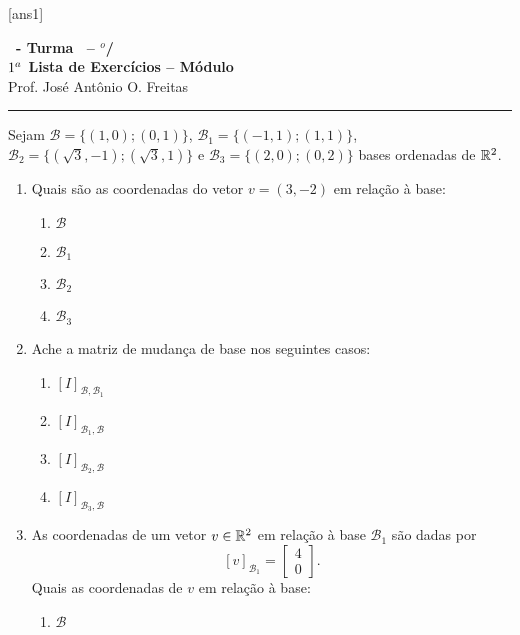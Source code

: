 \documentclass[12pt]{exam}
\begin{document}
  [ans1]
  \begin{center}
    {\Large\bf \disciplina\ - Turma \turma\ -- \semestre$^{o}$/\ano} \\ \vspace{9pt} {\large\bf
        $1^a$ Lista de Exercícios -- Módulo \numeromodulo}\\ \vspace{9pt} Prof. José Antônio O. Freitas
  \end{center}
  \hrule


\begin{exercicio}
    Sejam $\mathcal{B} = \{(1,0);(0,1)\}$, $\mathcal{B}_1 = \{(-1,1);(1,1)\}$, $\mathcal{B}_2 = \{(\sqrt{3},-1);(\sqrt{3},1)\}$ e $\mathcal{B}_3 = \{(2,0);(0,2)\}$ bases ordenadas de $\mathbb{R}^2$.
    \begin{enumerate}[label={\alph*})]
        \item Quais são as coordenadas do vetor $v = (3,-2)$ em relação à base:
        \begin{enumerate}[label=({\roman*})]
            \item $\mathcal{B}$

            \item $\mathcal{B}_1$

            \item $\mathcal{B}_2$

            \item $\mathcal{B}_3$
        \end{enumerate}

        \item Ache a matriz de mudança de base nos seguintes casos:
        \begin{enumerate}[label={\roman*})]
            \item $[I]_{\mathcal{B},\mathcal{B}_1}$

            \item $[I]_{\mathcal{B}_1,\mathcal{B}}$

            \item $[I]_{\mathcal{B}_2,\mathcal{B}}$

            \item $[I]_{\mathcal{B}_3,\mathcal{B}}$
        \end{enumerate}

        \item As coordenadas de um vetor $v \in \mathbb{R}^2$ em relação à base $\mathcal{B}_1$ são dadas por
        \[
        [v]_{\mathcal{B}_1} = \begin{bmatrix}
            4\\0
        \end{bmatrix}.
        \]
        Quais as coordenadas de $v$ em relação à base:
        \begin{enumerate}[label={\roman*})]
            \item $\mathcal{B}$


\end{enumerate}
\end{enumerate}
\end{exercicio}
\end{document}
